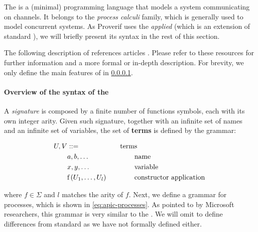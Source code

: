 The \pic{} \cite{pi-calculus-book} is a (minimal) programming language that models a system communicating on channels. It belongs to the \textit{process calculi} family, which is generally used to model concurrent systems. As Proverif uses the \textit{applied} \pic{} (which is an extension of standard \pic{}{}), we will briefly present its syntax in the rest of this section.

The following description of \apic{} references articles \cite{applied-pi-calculus-abadi-1, applied-pi-calculus-abadi-2, applied-pi-calculus-private-auth}. Please refer to these resources for further information and a more formal or in-depth description. For brevity, we only define the main features of \apic{} in \cref{subsub:syntax-apic}.

\paragraph{Overview of the syntax of the \apic{}}
\label{subsub:syntax-apic}

A \textit{signature \textSigma} is composed by a finite number of functions symbols, each with its own integer arity. Given such signature, together with an infinite set of names and an infinite set of variables, the set of \textbf{terms} is defined by the grammar:

\begin{equation}
    \label{eq:apic-terms}
    \begin{aligned}
        U, V & ::=                        \\
             & a, b, \ldots               \\
             & x, y, \ldots               \\
             & \mbox{f}\left(U_1, \ldots, U_l\right)
    \end{aligned}
    \qquad
    \begin{aligned}
        \mbox{term} & \mbox{s}                       \\
                    & \mbox{name}                    \\
                    & \mbox{variable}                \\
                    & \mbox{constructor application}
    \end{aligned}
\end{equation}

where $f \in \Sigma$ and $l$ matches the arity of $f$. Next, we define a grammar for processes, which is shown in \cref{eq:apic-processes}. As pointed to by Microsoft researchers, this grammar is very similar to the \pic{} \cite{applied-pi-calculus-private-auth}. We will omit to define differences from standard \pic{} as we have not formally defined \pic{} either.

